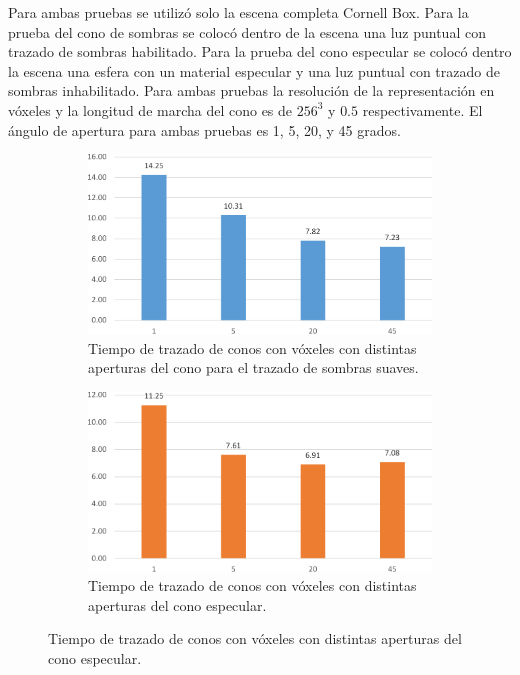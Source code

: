 Para ambas pruebas se utilizó solo la escena completa Cornell Box. Para la prueba del cono de sombras se colocó dentro de la escena una luz puntual con trazado de sombras habilitado. Para la prueba del cono especular se colocó dentro la escena una esfera con un material especular y una luz puntual con trazado de sombras inhabilitado. Para ambas pruebas la resolución de la representación en vóxeles y la longitud de marcha del cono es de $256^3$ y $0.5$ respectivamente. El ángulo de apertura para ambas pruebas es 1, 5, 20, y 45 grados.

\begin{figure}[H]
	\centering
	\begin{subfigure}{.7\textwidth}
		\centering
		\includegraphics[width=\linewidth]{media/shadowcone_aperture_cropped.pdf}
		\caption{Tiempo de trazado de conos con vóxeles con distintas aperturas del cono para el trazado de sombras suaves.}
		\label{fig:shadowcone_aperture}
	\end{subfigure}
	\par\bigskip
	\begin{subfigure}{.7\textwidth}
		\centering
		\includegraphics[width=\linewidth]{media/specularcone_aperture_cropped.pdf}
		\caption{Tiempo de trazado de conos con vóxeles con distintas aperturas del cono especular.}
		\label{fig:specularcone_aperture}
	\end{subfigure}
\end{figure}

